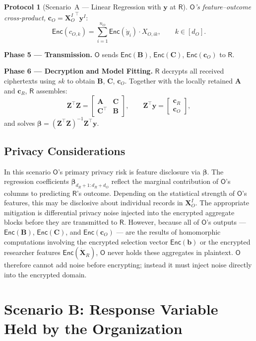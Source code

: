 \documentclass[12pt]{article}
\theoremstyle{definition}
\newtheorem{protocol}{Protocol}[section]
\theoremstyle{plain}
\newcommand{\Enc}[1]{\mathsf{Enc}\!\left(#1\right)}
\newcommand{\bXOI}{\mathbf{X}_{O}^{I}}
\newcommand{\bZ}{\mathbf{Z}}
\newcommand{\by}{\mathbf{y}}
\newcommand{\bb}{\mathbf{b}}
\newcommand{\bbeta}{\boldsymbol{\beta}}
\newcommand{\bA}{\mathbf{A}}
\newcommand{\bB}{\mathbf{B}}
\newcommand{\bC}{\mathbf{C}}
\newcommand{\bcR}{\mathbf{c}_{R}}
\newcommand{\bcO}{\mathbf{c}_{O}}
\newcommand{\dXR}{\dot{\mathbf{X}}_{R}}
\newcommand{\Party}[1]{\textsf{#1}}
\newcommand{\sk}{\mathit{sk}}
\begin{document}
\begin{protocol}[Scenario~A --- Linear Regression with $\by$ at $\Party{R}$]
\emph{$\Party{O}$'s feature--outcome cross-product,} $\bcO = {\bXOI}^{\top}\by^{I}$:
\begin{equation}
  \label{eq:cO_A}
  \Enc{c_{O,k}} = \sum_{i=1}^{n_{O}} \Enc{\dot{y}_{i}} \cdot X_{O,ik},
  \qquad k \in [d_{O}].
\end{equation}

\smallskip
\textbf{Phase 5 --- Transmission.}
$\Party{O}$ sends $\Enc{\bB}$, $\Enc{\bC}$, $\Enc{\bcO}$ to $\Party{R}$.

\smallskip
\textbf{Phase 6 --- Decryption and Model Fitting.}
$\Party{R}$ decrypts all received ciphertexts using $\sk$ to obtain $\bB$, $\bC$, $\bcO$. Together with the locally retained $\bA$ and $\bcR$, $\Party{R}$ assembles:
\[
  \bZ^{\top}\bZ =
  \begin{bmatrix} \bA & \bC \\ \bC^{\top} & \bB \end{bmatrix}, \qquad
  \bZ^{\top}\by =
  \begin{bmatrix} \bcR \\ \bcO \end{bmatrix},
\]
and solves $\bbeta = (\bZ^{\top}\bZ)^{-1}\bZ^{\top}\by$.
\end{protocol}


\subsection{Privacy Considerations}

In this scenario $\Party{O}$'s primary privacy risk is feature disclosure via $\bbeta$. The regression coefficients $\bbeta_{d_{R}+1:d_{R}+d_{O}}$ reflect the marginal contribution of $\Party{O}$'s columns to predicting $\Party{R}$'s outcome. Depending on the statistical strength of $\Party{O}$'s features, this may be disclosive about individual records in $\bXOI$. The appropriate mitigation is differential privacy noise injected into the encrypted aggregate blocks before they are transmitted to $\Party{R}$. However, because all of $\Party{O}$'s outputs --- $\Enc{\bB}$, $\Enc{\bC}$, and $\Enc{\bcO}$ --- are the results of homomorphic computations involving the encrypted selection vector $\Enc{\bb}$ or the encrypted researcher features $\Enc{\dXR}$, $\Party{O}$ never holds these aggregates in plaintext. $\Party{O}$ therefore cannot add noise before encrypting; instead it must inject noise directly into the encrypted domain.

\section{Scenario B: Response Variable Held by the Organization}
\label{sec:scenB}
\end{document}
